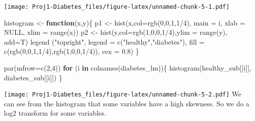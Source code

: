 \documentclass[
]{article}
\newenvironment{Shaded}{\begin{snugshade}}{\end{snugshade}}
\newcommand{\AttributeTok}[1]{\textcolor[rgb]{0.77,0.63,0.00}{#1}}
\newcommand{\ConstantTok}[1]{\textcolor[rgb]{0.00,0.00,0.00}{#1}}
\newcommand{\ControlFlowTok}[1]{\textcolor[rgb]{0.13,0.29,0.53}{\textbf{#1}}}
\newcommand{\DecValTok}[1]{\textcolor[rgb]{0.00,0.00,0.81}{#1}}
\newcommand{\FloatTok}[1]{\textcolor[rgb]{0.00,0.00,0.81}{#1}}
\newcommand{\FunctionTok}[1]{\textcolor[rgb]{0.00,0.00,0.00}{#1}}
\newcommand{\NormalTok}[1]{#1}
\newcommand{\OtherTok}[1]{\textcolor[rgb]{0.56,0.35,0.01}{#1}}
\newcommand{\SpecialCharTok}[1]{\textcolor[rgb]{0.00,0.00,0.00}{#1}}
\newcommand{\StringTok}[1]{\textcolor[rgb]{0.31,0.60,0.02}{#1}}
\begin{document}
\texttt{[image: Proj1-Diabetes\_files/figure-latex/unnamed-chunk-5-1.pdf]}

\begin{Shaded}
\begin{Highlighting}[]
\NormalTok{histogram }\OtherTok{\textless{}{-}} \ControlFlowTok{function}\NormalTok{(x,y)\{}
\NormalTok{  p1 }\OtherTok{\textless{}{-}} \FunctionTok{hist}\NormalTok{(x,}\AttributeTok{col=}\FunctionTok{rgb}\NormalTok{(}\DecValTok{0}\NormalTok{,}\DecValTok{0}\NormalTok{,}\DecValTok{1}\NormalTok{,}\DecValTok{1}\SpecialCharTok{/}\DecValTok{4}\NormalTok{), }\AttributeTok{main =}\NormalTok{ i, }\AttributeTok{xlab =} \ConstantTok{NULL}\NormalTok{, }\AttributeTok{xlim =} \FunctionTok{range}\NormalTok{(x))}
\NormalTok{  p2 }\OtherTok{\textless{}{-}} \FunctionTok{hist}\NormalTok{(y,}\AttributeTok{col=}\FunctionTok{rgb}\NormalTok{(}\DecValTok{1}\NormalTok{,}\DecValTok{0}\NormalTok{,}\DecValTok{0}\NormalTok{,}\DecValTok{1}\SpecialCharTok{/}\DecValTok{4}\NormalTok{),}\AttributeTok{ylim =} \FunctionTok{range}\NormalTok{(y), }\AttributeTok{add=}\NormalTok{T)}
  \FunctionTok{legend}\NormalTok{ (}\StringTok{"topright"}\NormalTok{, }\AttributeTok{legend =} \FunctionTok{c}\NormalTok{(}\StringTok{"healthy"}\NormalTok{,}\StringTok{"diabetes"}\NormalTok{),}
          \AttributeTok{fill =} \FunctionTok{c}\NormalTok{(}\FunctionTok{rgb}\NormalTok{(}\DecValTok{0}\NormalTok{,}\DecValTok{0}\NormalTok{,}\DecValTok{1}\NormalTok{,}\DecValTok{1}\SpecialCharTok{/}\DecValTok{4}\NormalTok{),}\FunctionTok{rgb}\NormalTok{(}\DecValTok{1}\NormalTok{,}\DecValTok{0}\NormalTok{,}\DecValTok{0}\NormalTok{,}\DecValTok{1}\SpecialCharTok{/}\DecValTok{4}\NormalTok{)), }\AttributeTok{cex =} \FloatTok{0.8}\NormalTok{)}
\NormalTok{\}}

\FunctionTok{par}\NormalTok{(}\AttributeTok{mfrow=}\FunctionTok{c}\NormalTok{(}\DecValTok{2}\NormalTok{,}\DecValTok{4}\NormalTok{))}
\ControlFlowTok{for}\NormalTok{ (i }\ControlFlowTok{in} \FunctionTok{colnames}\NormalTok{(diabetes\_lm))\{}
  \FunctionTok{histogram}\NormalTok{(healthy\_sub[[i]], diabetes\_sub[[i]])}
\NormalTok{\}}
\end{Highlighting}
\end{Shaded}

\texttt{[image: Proj1-Diabetes\_files/figure-latex/unnamed-chunk-5-2.pdf]}
We can see from the histogram that some variables have a high skewness.
So we do a log2 transform for some variables.
\end{document}
